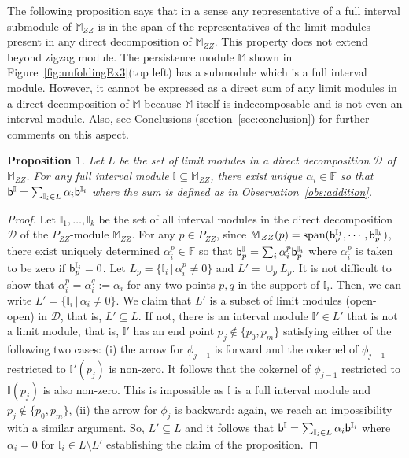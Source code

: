 \documentclass[11pt]{article}
\theoremstyle{plain}%
\newtheorem{proposition}{Proposition}[section]
\newcommand{\Int}{\mathbb{I}}
\newcommand{\M}{\mathbb{M}}
\newcommand{\D}{\mathcal{D}}
\newcommand{\bs}{{\sf b}}
\begin{document}
The following proposition says that in a sense any representative of
a full interval submodule of $\M_{ZZ}$ is in the
span of the representatives of the limit modules present in any direct decomposition of $\M_{ZZ}$. This property does not extend beyond zigzag module. The persistence
module $\M$ shown in Figure~\ref{fig:unfoldingEx3}(top left) has a submodule
which is a full interval module. However, it cannot be expressed as a direct sum
of any limit modules in a direct decomposition of $\M$ because $\M$ itself
is indecomposable and is not even an interval module. Also, see Conclusions (section~\ref{sec:conclusion})
for further comments on this aspect.
\begin{proposition}
    Let $L$ be the set of limit modules in a direct decomposition $\D$ of
    $\M_{ZZ}$. For any full interval module $\Int\subseteq \M_{ZZ}$,
    there exist unique $\alpha_i\in \mathbb{F}$ so that 
    $\bs^\Int=\sum_{\Int_i\in L} \alpha_i\bs^{\Int_i}$ where the sum is defined
    as in Observation~\ref{obs:addition}.
    \label{prop:limit-module}
\end{proposition}

\begin{proof}
    Let $\Int_1,\ldots,\Int_k$ be the set of all interval modules in the
    direct decomposition $\D$ of the $P_{ZZ}$-module $\M_{ZZ}$. For any $p\in P_{ZZ}$, since $\M_{ZZ}(p)=\text{span}(\bs^{\Int_1}_p,\cdots,\bs^{\Int_k}_p)$, there exist uniquely determined
    $\alpha^p_i\in\mathbb{F}$ so that
    $\bs^{\Int}_p=\sum_i \alpha^p_i \bs^{\Int_i}_{p}$ where
    $\alpha_i^p$ is taken to be zero if $\bs^{\Int_i}_{p}=0$. Let $L_p=\{\Int_i\,|\, \alpha^p_i\not=0\}$
    and $L'=\cup_p L_p$. It is not difficult to show that
    $\alpha^p_i=\alpha^q_i:=\alpha_i$ for any two points $p,q$
    in the support of $\Int_i$.
    Then, we can write $L'=\{\Int_i \,|\, \alpha_i\not = 0\}$. We claim that
    $L'$ is a subset of limit modules (open-open) in $\D$, that is, $L'\subseteq L$. If not, there is an interval module $\Int'\in L'$ that is not
    a limit module, that is, $\Int'$ has an end point $p_j\not \in \{p_0, p_m\}$ satisfying either of the following two cases: (i) the arrow for $\phi_{j-1}$ is forward and the cokernel of $\phi_{j-1}$ restricted to $\Int'(p_{j})$ is non-zero.
    It follows that the cokernel of $\phi_{j-1}$ restricted to $\Int(p_{j})$ is also non-zero. This
    is impossible as $\Int$ is a full interval module and $p_j\not\in\{p_0,p_m\}$, (ii) the arrow for $\phi_{j}$ is backward: again, we reach an impossibility with a similar argument. So, $L'\subseteq L$ and it follows that $\bs^\Int=\sum_{\Int_i\in L}\alpha_i\bs^{\Int_i}$ where $\alpha_i=0$ for $\Int_i\in L\setminus L'$ establishing the claim of the proposition. 
\end{proof}
\end{document}
